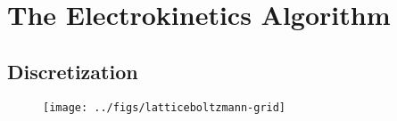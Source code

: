 \section{The Electrokinetics Algorithm}

\subsection*{Discretization}

\begin{figure}[htp]
\begin{center}
  \texttt{[image: ../figs/latticeboltzmann-grid]}
  \caption[]{}
  \label{fig:model-d3q18grid}
\end{center}
\end{figure}

\pagebreak

